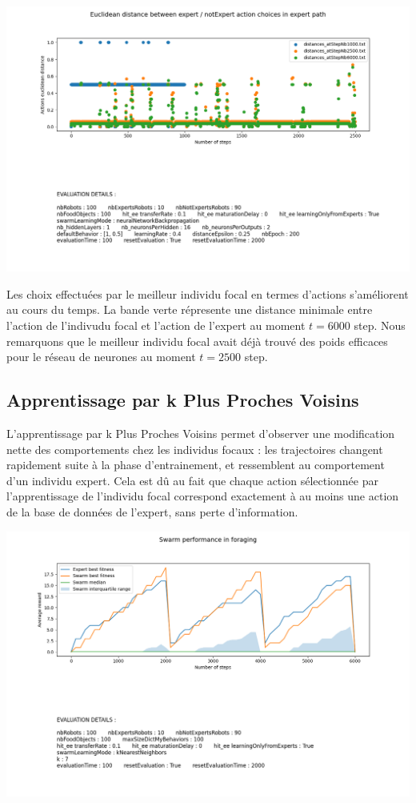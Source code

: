 \documentclass[a4paper, 12pt]{report}
\begin{document}
    \includegraphics[scale=0.5]{distances_bp.png}

    Les choix effectuées par le meilleur individu focal en termes d'actions s'améliorent au cours du temps. La bande verte répresente une distance minimale entre l'action de l'indivudu focal et l'action de l'expert au moment $t = 6000$ step.
    Nous remarquons que le meilleur individu focal avait déjà trouvé des poids efficaces pour le réseau de neurones au moment $t = 2500$ step. 





    \subsection{Apprentissage par k Plus Proches Voisins}
    L'apprentissage par k Plus Proches Voisins permet d'observer une modification nette des comportements chez les individus focaux : les trajectoires changent rapidement suite à la phase d'entrainement, et ressemblent au comportement d'un individu expert. Cela est dû au fait que chaque action sélectionnée par l'apprentissage de l'individu focal correspond exactement à au moins une action de la base de données de l'expert, sans perte d'information.
    
    
    \includegraphics[scale=0.5]{knn6000_100.png}
    
\end{document}
